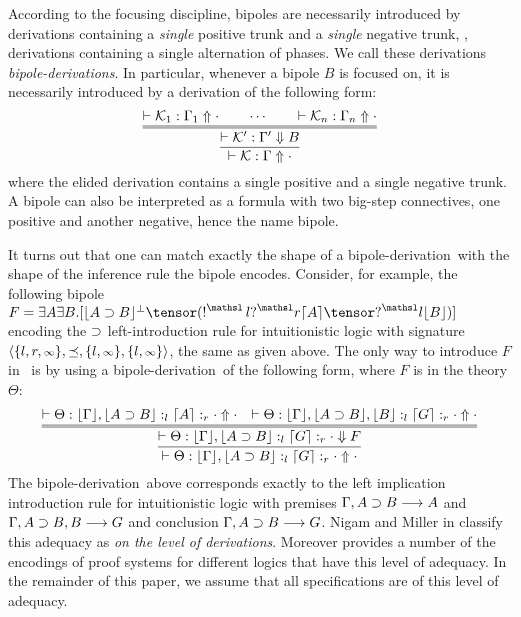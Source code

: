 \newcommand\bDer{\textrm{bipole-derivation}}
\newcommand\BDer{\textrm{Bipole-derivation}}
\newcommand\bDers{\textrm{bipole-derivations}}
\newcommand\BDers{\textrm{Bipole-derivations}}

\newcommand{\lftQ}[1]{\nquest{l} \lfloor #1 \rfloor}
\newcommand{\rghtQ}[1]{\nquest{r} \lceil #1 \rceil}

According to the focusing discipline, bipoles are necessarily introduced by
derivations containing a \emph{single} positive trunk and a \emph{single}
negative trunk, \ie, derivations containing a single alternation of phases.
We call these derivations \emph{\bDers}.
In particular, whenever a bipole $B$ is focused on, it is necessarily
introduced by a derivation of the following form:
{\small
\[
\infer{\vdash \Kscr: \Gamma \Uparrow \cdot}{
 \infer={\vdash \Kscr' : \Gamma' \Downarrow B}
{
\vdash \Kscr_1 : \Gamma_1 \Uparrow \cdot
\qquad \cdots \qquad
\vdash \Kscr_n : \Gamma_n \Uparrow \cdot
}
}
\]
}
where the elided derivation contains a single
positive and a single negative trunk. A bipole can also be interpreted as a
formula with two big-step connectives, one positive and another negative,
hence the name bipole. 

It turns out that one can match exactly the shape
of a \bDer\ with the
shape of the inference rule the bipole
encodes.
Consider, for example, the
following bipole $F = \exists A \exists B.[\lft{A\iimp B}^\bot \tensor
(\nbang{l} \rghtQ{A}\tensor\lftQ{B})]$ encoding the $\supset$
left-introduction rule
for intuitionistic logic with signature $\langle\{l,r,
{\scriptstyle\infty}\},\preceq,\{l, {\scriptstyle\infty}\}, \{l, {\scriptstyle\infty}\}\rangle$, the same as given above.
The only way to introduce $F$ in \sellf\ is by using a \bDer\ of the
following form, where $F$  is in the theory $\Theta$:
{\small
\[
 \infer{\vdash \Theta : \lft{\Gamma}, \lft{A \iimp B} :_l \rght{G} :_r
\cdot
\Uparrow \cdot}{
\infer={\vdash \Theta : \lft{\Gamma}, \lft{A \iimp B} :_l \rght{G} :_r
\cdot
\Downarrow F}{
\vdash \Theta : \lft{\Gamma}, \lft{A \iimp B} :_l \rght{A} :_r \cdot
\Uparrow \cdot
&
\vdash \Theta : \lft{\Gamma}, \lft{A \iimp B}, \lft{B} :_l \rght{G} :_r
\cdot
\Uparrow \cdot
}}
\]
}
The \bDer\ above corresponds exactly to the left implication
introduction rule for intuitionistic logic with premises
$\Gamma, A\supset B \longrightarrow A$ and $\Gamma, A \supset B, B \longrightarrow G$ and conclusion
$\Gamma, A\supset B \longrightarrow G$. 
Nigam and Miller in \cite{nigam10jar} classify this adequacy as \emph{on
the level of derivations}. Moreover \cite{nigam10jar,nigam11lsfa} provides
a number of the encodings of proof systems for different logics that have
this level of
adequacy. In the remainder of this paper, we assume that all specifications
are of this level of adequacy.

